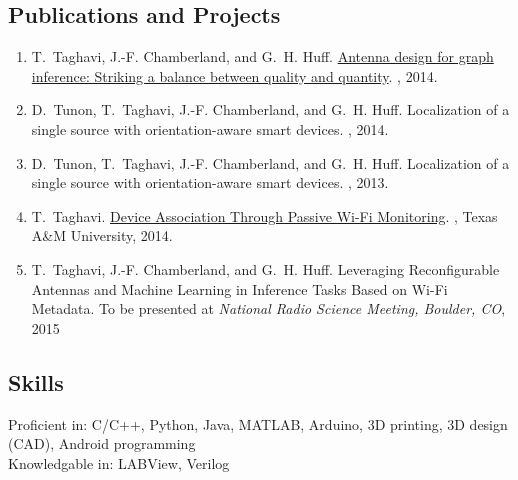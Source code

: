 \documentclass[11pt]{article}
\begin{document}
\subsection*{Publications and Projects}

\begin{enumerate}    \itemsep0pt

\item T.~Taghavi, J.-F. Chamberland, and G.~H. Huff.
\newblock \href{http://dx.doi.org/10.1109/USNC-URSI-NRSM.2014.6927995}
{Antenna design for graph inference: Striking a balance between quality and quantity}.
, 2014.

\item D.~Tunon, T.~Taghavi, J.-F. Chamberland, and G.~H. Huff.
\newblock \href{http://dx.doi.org/10.1109/USNC-URSI-NRSM.2014.6928007}
\newblock Localization of a single source with orientation-aware smart devices.
, 2014.

\item D.~Tunon, T.~Taghavi, J.-F. Chamberland, and G.~H. Huff.
\newblock \href{http://dx.doi.org/10.1109/GlobalSIP.2013.6736829}
\newblock Localization of a single source with orientation-aware smart devices.
, 2013.

\item T.~Taghavi.
\newblock \href{http://hdl.handle.net/1969.1/152045}{Device Association Through Passive Wi-Fi Monitoring}.
, Texas A\&M University, 2014.

\item T.~Taghavi, J.-F. Chamberland, and G.~H. Huff.
\newblock Leveraging Reconfigurable Antennas and Machine Learning in Inference Tasks Based on Wi-Fi Metadata.
\newblock To be presented at {\em National Radio Science Meeting, Boulder, CO}, 2015

\end{enumerate}

\subsection*{Skills}

Proficient in: C/C++, Python, Java, MATLAB, Arduino, 3D printing, 3D design (CAD), Android programming \\
Knowledgable in: LABView, Verilog\\
\end{document}
